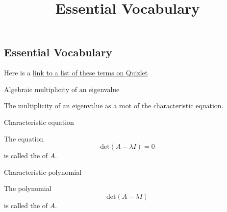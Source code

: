 \documentclass{ximera}
\title{Essential Vocabulary} \license{CC BY-NC-SA 4.0}
\begin{document}
\begin{abstract}
\end{abstract}
\maketitle


\begin{onlineOnly}
\section*{Essential Vocabulary}
Here is a  \href{https://quizlet.com/906040972/chapter-8-vocabulary-flash-cards/?i=y06sd&x=1jqt}{link to a list of these terms on Quizlet}
\end{onlineOnly}


Algebraic multiplicity of an eigenvalue
\begin{expandable}{}{}
    The multiplicity of an eigenvalue as a root of the characteristic equation.
\end{expandable}


Characteristic equation
\begin{expandable}{}{}
    The equation 
$$\mbox{det}(A-\lambda I) = 0$$ is called the  of $A$. 
\end{expandable}


Characteristic polynomial
\begin{expandable}{}{}
    The polynomial 
$$\mbox{det}(A-\lambda I)$$ is called the  of $A$. 
\end{expandable}

\end{document}
